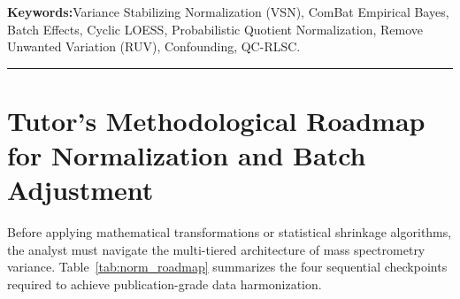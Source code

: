 \documentclass[11pt,oneside]{book}
\begin{document}
\noindent
\textbf{Keywords:}\enspace Variance Stabilizing Normalization (VSN), ComBat Empirical Bayes, Batch Effects, Cyclic LOESS, Probabilistic Quotient Normalization, Remove Unwanted Variation (RUV), Confounding, QC-RLSC.

\vspace{0.8em}
\noindent\rule{\textwidth}{0.4pt}

\section{Tutor's Methodological Roadmap for Normalization and Batch Adjustment}

Before applying mathematical transformations or statistical shrinkage algorithms, the analyst must navigate the multi-tiered architecture of mass spectrometry variance. Table~\ref{tab:norm_roadmap} summarizes the four sequential checkpoints required to achieve publication-grade data harmonization.
\end{document}

